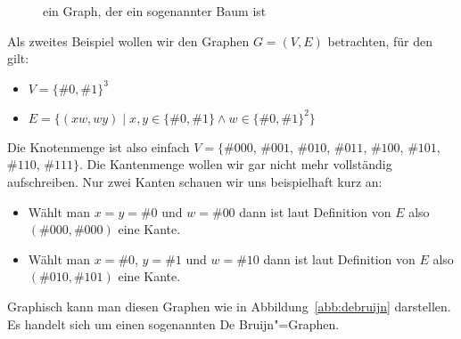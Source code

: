 \begin{figure}[ht] \centering
  \caption{ein Graph, der ein sogenannter Baum ist}
  \label{abb:baum}
\end{figure}
% 
Als zweites Beispiel wollen wir den Graphen $G=(V,E)$ betrachten, für
den gilt:
\begin{itemize}
\item $V=\{\#0,\#1\}^3$
\item $E=\{ (xw,wy) \mid x,y\in \{\#0,\#1\}\land w\in \{\#0,\#1\}^2
\}$
\end{itemize}
% 
Die Knotenmenge ist also einfach $V = \{ \#{000}$, $\#{001}$,
$\#{010}$, $\#{011}$, $\#{100}$, $\#{101}$, $\#{110}$, $\#{111} \}$.
% 
Die Kantenmenge wollen wir gar nicht mehr vollständig aufschreiben.
% 
Nur zwei Kanten schauen wir uns beispielhaft kurz an:
\begin{itemize}
\item Wählt man $x=y=\#0$ und $w=\#{00}$ dann ist laut Definition von
$E$ also $(\#{000},\#{000})$ eine Kante.
\item Wählt man $x=\#0$, $y=\#1$ und $w=\#{10}$ dann ist laut
Definition von $E$ also $(\#{010},\#{101})$ eine Kante.
\end{itemize}
% 
Graphisch kann man diesen Graphen \zB wie in
Abbildung~\ref{abb:debruijn} darstellen.
% 
Es handelt sich um einen sogenannten De Bruijn"=Graphen.
